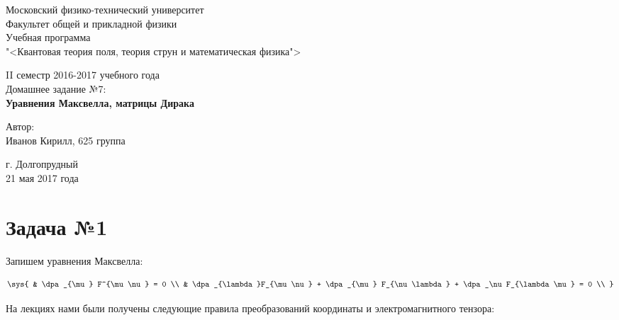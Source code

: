 \documentclass[12pt]{kiarticle}
\begin{document}
\begin{titlepage}		
	\begin{center}
		\large 	Московский физико-технический университет \\
		Факультет общей и прикладной физики \\
		\vspace{0.2cm}
		Учебная программа\\
		"<Квантовая теория поля, теория струн и математическая физика">
		
		\vspace{4.5cm}
		II семестр 2016-2017 учебного года \\ \vspace{0.1cm}
		\large Домашнее задание №7: \\ \vspace{0.1cm}
		\LARGE \textbf{Уравнения Максвелла, матрицы Дирака}
	\end{center}
	\vspace{2.3cm} \large
	
	\begin{center}
		Автор: \\
		Иванов Кирилл,
		625 группа
		\vspace{10mm}
		
		
	\end{center}
	
	\begin{center} \vspace{50mm}
		г. Долгопрудный \\ 
		21 мая 2017 года
	\end{center}
\end{titlepage}


\section{Задача №1}

Запишем уравнения Максвелла: 

\begin{eqnarray}
\sys{
	& \dpa_{\mu} F^{\mu\nu} = 0   \\ 
	& \dpa_{\lambda}F_{\mu\nu} + \dpa_{\mu} F_{\nu\lambda} + \dpa_\nu F_{\lambda\mu} = 0 \\ 
}
\end{eqnarray}

На лекциях нами были получены следующие правила преобразований координаты и электромагнитного тензора:
\end{document}
